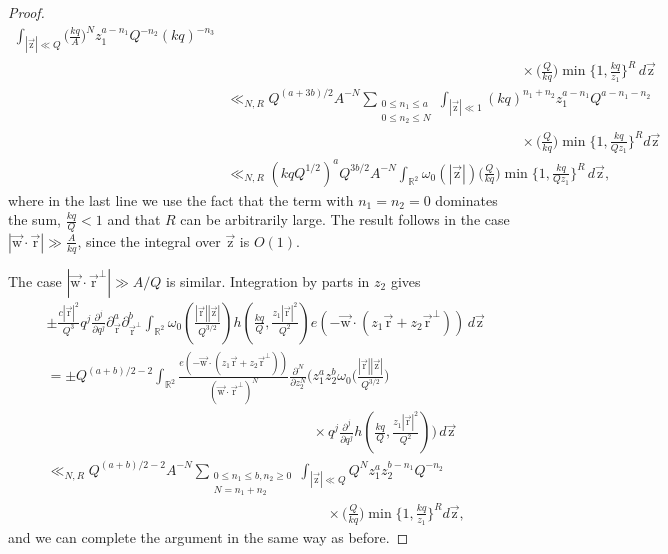 \documentclass[letterpaper,11pt]{amsart}
\numberwithin{equation}{section}
\theoremstyle{definition}
\numberwithin{equation}{section}
\newcommand{\ur}{\vec{\mathrm{r}}}
\newcommand{\uz}{{\vec{\mathrm{z}}}}
\newcommand{\uw}{{\vec{\mathrm{w}}}}
\newcommand{\R}{\mathbb{R}}
\begin{document}
\begin{proof}
\begin{align*}
	\int_{|\uz|\ll Q}
	\Big(
	\frac{kq}{A}
	\Big)^N
		z_1^{a-n_1}
	Q^{-n_2}
	\left(
	kq
	\right)^{-n_3}\\ & \quad \quad \quad \quad \quad \quad\quad \quad \quad  \quad \quad \quad\quad \quad \quad\quad \quad \quad\quad \quad \quad	\times \big(\frac{Q}{kq}\big)
	\min
	\Big\{1,
	\frac{kq}{ z_1}
	\Big\}^R	
	\,d\uz\\
	&\ll_{N,R} Q^{(a+3b)/2}A^{-N}\sum_{\substack{0\leq n_{1}\leq a\\ 0\leq n_{2}\leq N}}\int_{|\uz|\ll 1}(kq)^{n_{1}+n_{2}}z_{1}^{a-n_{1}}Q^{a-n_{1}-n_{2}}\\ & \quad \quad \quad \quad \quad \quad\quad \quad \quad  \quad \quad \quad\quad \quad \quad\quad \quad \quad\quad \quad \quad	\times \big(\frac{Q}{kq}\big)\min\Big\{1, \frac{kq}{Qz_{1}}\Big\}^{R}d\uz\\
&\ll_{N,R} 
\left(kqQ^{1/2}\right)^a Q^{3b/2}  A^{-N}
	\int_{\R^2}
	\omega_0(|\uz|)
	\big(
	\frac{Q}{kq}
	\big)
	\min
	\Big\{1,
	\frac{kq}{ Qz_1}
	\Big\}^R	
	\,d\uz,
	\end{align*}
	where in the last line we use the fact that the term with \(n_{1}=n_2=0\) dominates the sum,
	\(\frac{kq}{Q}<1\) and that \(R\) can be arbitrarily large. The result follows in the case $|\uw \cdot \ur|\gg \frac{A}{kq}$, since the integral over $\uz$ is $O(1)$. 
	
	The case \(
	|\uw\cdot \ur^\perp|
	\gg A/Q\) is similar. Integration by parts in $z_2$ gives 
	\begin{align*}
	&\pm\frac{c|\ur|^2}{Q^3}
	q^j\frac{\partial^j}{\partial q^j}
	\partial_{\ur }^a
	\partial_{\ur ^\perp}^b	\int_{\R^2}
		\omega_0\left(\frac{|\ur||\uz|}{Q^{3/2}}\right)
		h\left(
		\frac{kq}{Q},
		\frac{z_1|\ur|^2 }{ Q^2}
		\right)
		e(-\uw\cdot (z_1\ur+z_2\ur^\perp))
		\,d\uz
		\\
		&=\pm Q^{(a+b)/2-2}
		\int_{\R^2}
		\frac{e(-\uw\cdot (z_1\ur+z_2\ur^\perp))
		}{(\uw\cdot\ur^\perp)^N}
		\frac{\partial^N}{\partial z_2^N}
		\Big(
		z_1^a z_2^b
		\omega_0\big(\frac{|\ur||\uz|}{Q^{3/2}}\big)
		\\ & \quad \quad \quad \quad \quad \quad\quad \quad \quad  \quad \quad \quad\quad \quad \quad\quad \quad \quad\quad 	\times q^j\frac{\partial^j}{\partial q^j}
		h\left(
		\frac{kq}{Q},
		\frac{z_1|\ur|^2 }{ Q^2}
		\right)\Big)
		\,d\uz\\
		&\ll_{N,R}Q^{(a+b)/2-2}A^{-N}\sum_{\substack{0\leq n_{1}\leq b, n_{2}\geq 0\\ N=n_{1}+n_{2}}}\int_{|\uz|\ll Q}Q^{N}z_{1}^{a}z_{2}^{b-n_{1}}Q^{-n_{2}}\\ & \quad \quad \quad \quad \quad \quad\quad \quad \quad  \quad \quad \quad\quad \quad \quad\quad \quad \quad\quad \quad \times\big(\frac{Q}{kq}\big)\min\Big\{1, \frac{kq}{z_{1}}\Big\}^{R}d\uz,
	\end{align*}
	and we can complete the argument in the same way as before.
\end{proof}
 
\end{document}
